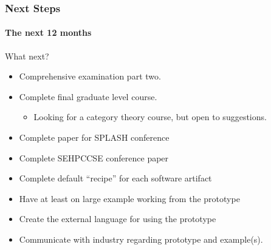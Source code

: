 \documentclass{beamer}
\begin{document}

\begin{frame}

\frametitle{Next Steps}
\framesubtitle{The next 12 months}


\begin{Large}
What next?
\end{Large}

\begin{itemize}
\item Comprehensive examination part two.
\item Complete final graduate level course.
\begin{itemize} %
\item Looking for a category theory course, but open to suggestions.
\end{itemize}
\item Complete paper for SPLASH conference %
\item Complete SEHPCCSE conference paper %
\item Complete default ``recipe'' for each software artifact %
\item Have at least on large example working from the prototype
\item Create the external language for using the prototype %
\item Communicate with industry regarding prototype and example(s). %
\end{itemize}
\end{frame}


\end{document}
